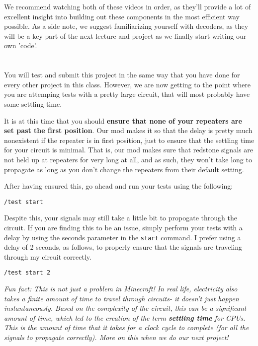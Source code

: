 \documentclass{article}
\begin{document}
We recommend watching both of these videos in order, as they'll provide a lot of excellent insight into building out these components in the most efficient way possible.
As a side note, we suggest familiarizing yourself with decoders, as they will be a key part of the next lecture and project as we finally start writing our own 'code'.

\section{\selectfont{Testing \& Submission}}

You will test and submit this project in the same way that you have done for every other project in this class. 
However, we are now getting to the point where you are attemping tests with a pretty large circuit, that will most probably have some settling time.

It is at this time that you should \textbf{ensure that none of your repeaters are set past the first position}. 
Our mod makes it so that the delay is pretty much nonexistent if the repeater is in first position, just to ensure that the settling time for your circuit is minimal.
That is, our mod makes sure that redstone signals are not held up at repeaters for very long at all, and as such, they won't take long to propagate as long as you don't change the repeaters from their default setting.

After having ensured this, go ahead and run your tests using the following:

\begin{tcolorbox}
  \texttt{/test start}
\end{tcolorbox}

Despite this, your signals may still take a little bit to propogate through the circuit. 
If you are finding this to be an issue, simply perform your tests with a delay by using the seconds parameter in the \texttt{start} command.
I prefer using a delay of 2 seconds, as follows, to properly ensure that the signals are traveling through my circuit correctly.

\begin{tcolorbox}
  \texttt{/test start 2}
\end{tcolorbox}

\textit{Fun fact: This is not just a problem in Minecraft! In real life, electricity also takes a finite amount of time to travel through circuits- it doesn't just happen instantaneously. Based on the complexity of the circuit, this can be a significant amount of time, which led to the creation of the term \textbf{settling time} for CPUs. This is the amount of time that it takes for a clock cycle to complete (for all the signals to propagate correctly). More on this when we do our next project!}
\end{document}
